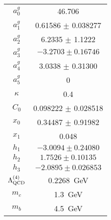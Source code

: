 \documentclass[aps,prd,amsmath,preprint]{revtex4}
\begin{document}
\begin{table}[htb]
\begin{center}
{\begin{tabular}{c|c}
%
$a_0^g$		& 46.706                        \\
$a_1^g$		& 0.61586 $\pm$ 0.038277	\\
$a_2^g$		& 6.2335 $\pm$ 1.1222           \\
$a_3^g$		& $-3.2703 \pm 0.16746$         \\
$a_4^g$		& 3.0338 $\pm$ 0.31300          \\
$a_5^g$		& 0				\\ \hline
%
$\kappa$	& 0.4                           \\ \hline
%
$C_0$ & 0.098222 $\pm$ 0.028518			\\
$x_0$ & 0.34487  $\pm$ 0.91982			\\
$x_1$ & 0.048					\\ \hline
%
$h_1$ & $-3.0094 \pm 0.24080$			\\    
$h_2$ & $ 1.7526 \pm 0.10135$           	\\       
$h_3$ & $-2.0895 \pm 0.026853$           	\\ \hline
%
$\Lambda_{\rm QCD}^{(4)}$ & 0.2268~GeV          \\
$m_c$		& 1.3~GeV			\\
$m_b$		& 4.5~GeV			\\ \hline
\end{tabular}
}
\label{tab:parameters}
\end{center}
\end{table}
\end{document}
